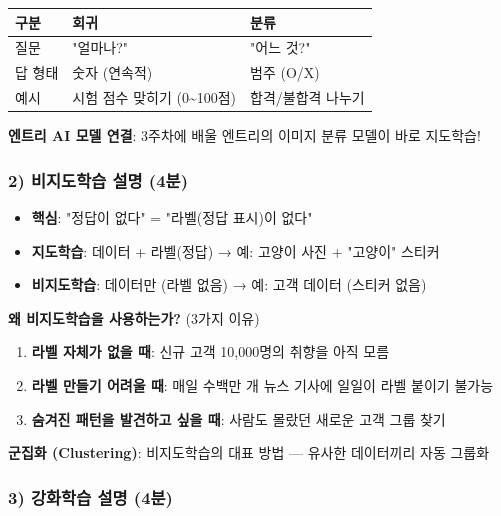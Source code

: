 \documentclass[11pt,a4paper]{article}
\begin{document}
\begin{tipbox}
\begin{center}
\begin{tabular}{C{2cm}C{5cm}C{5cm}}
\toprule
\textbf{구분} & \textbf{회귀} & \textbf{분류} \\
\midrule
질문 & "얼마나?" & "어느 것?" \\
답 형태 & 숫자 (연속적) & 범주 (O/X) \\
예시 & 시험 점수 맞히기 (0\textasciitilde100점) & 합격/불합격 나누기 \\
\bottomrule
\end{tabular}
\end{center}
\end{tipbox}

\textbf{엔트리 AI 모델 연결}: 3주차에 배울 엔트리의 이미지 분류 모델이 바로 지도학습!

\subsubsection{2) 비지도학습 설명 (4분)}

\begin{infobox}
\begin{itemize}[leftmargin=1.5em]
\item \textbf{핵심}: "정답이 없다" = "라벨(정답 표시)이 없다"
\item \textbf{지도학습}: 데이터 + 라벨(정답) → 예: 고양이 사진 + "고양이" 스티커 
\item \textbf{비지도학습}: 데이터만 (라벨 없음) → 예: 고객 데이터 (스티커 없음) 
\end{itemize}
\end{infobox}

\textbf{왜 비지도학습을 사용하는가?} (3가지 이유)
\begin{enumerate}[leftmargin=2em]
\item \textbf{라벨 자체가 없을 때}: 신규 고객 10,000명의 취향을 아직 모름
\item \textbf{라벨 만들기 어려울 때}: 매일 수백만 개 뉴스 기사에 일일이 라벨 붙이기 불가능
\item \textbf{숨겨진 패턴을 발견하고 싶을 때}: 사람도 몰랐던 새로운 고객 그룹 찾기
\end{enumerate}

\textbf{군집화 (Clustering)}: 비지도학습의 대표 방법 — 유사한 데이터끼리 자동 그룹화

\subsubsection{3) 강화학습 설명 (4분)}
\end{document}
